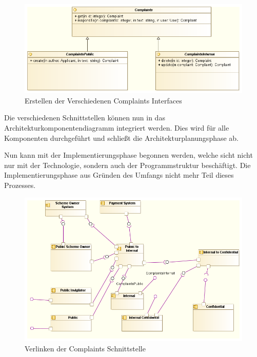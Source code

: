 \begin{figure}[H]
    \centering
    \includegraphics[scale=0.6]{uml/complaintsinterface.png}
    \caption{Erstellen der Verschiedenen Complaints Interfaces}
\end{figure}

Die verschiedenen Schnittstellen können nun in das Architekturkomponentendiagramm integriert werden. Dies wird für alle Komponenten durchgeführt und schließt die Architekturplanungsphase ab.

Nun kann mit der Implementierungsphase begonnen werden, welche sicht nicht nur mit der Technologie, sondern auch der Programmstruktur beschäftigt. Die Implementierungsphase aus Gründen des Umfangs nicht mehr Teil dieses Prozesses.

\begin{figure}[H]
    \centering
    \includegraphics[scale=0.6]{uml/v5.png}
    \caption{Verlinken der Complaints Schnittstelle}
\end{figure}